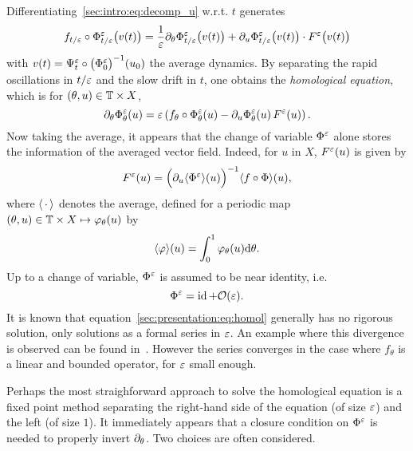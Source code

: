 Differentiating~\eqref{sec:intro:eq:decomp_u} w.r.t. \( t \) generates
\begin{equation*}
  f_{t/\varepsilon} \circ \Phi^\varepsilon_{t/\varepsilon} \big( v(t) \big) 
  = \frac{1}{\varepsilon} \partial_\theta \Phi^\varepsilon_{t/\varepsilon} \big( v(t) \big)
  + \partial_u \Phi^\varepsilon_{t/\varepsilon}\big( v(t) \big) \cdot F^\varepsilon \big( v(t) \big)
\end{equation*}
with \( v(t) = \Psi^\varepsilon_t \circ \big( \Phi^\varepsilon_0 \big)^{-1} (u_0) \)
the average dynamics. By separating the rapid oscillations in $t/\varepsilon$
and the slow drift in $t$, one obtains the \textit{homological
equation}, which is for $(\theta, u) \in \mathbb{T} \times X$, 
\begin{equation} \label{sec:presentation:eq:homol}
  \partial_\theta \Phi^\varepsilon_{\theta} (u)
  = \varepsilon \left( f_{\theta} \circ \Phi^\varepsilon_{\theta} (u) 
    - \partial_u \Phi^\varepsilon_{\theta} (u) \, F^\varepsilon (u) \right) .
\end{equation}
Now taking the average, it appears that the change of variable $\Phi^\varepsilon$
alone stores the information of the averaged vector field. Indeed, for $u$
in $X$, $F^\varepsilon(u)$ is given by
\begin{equation}
  F^\varepsilon (u) = \Big( \partial_u \langle \Phi^\varepsilon \rangle (u) \Big)^{-1} 
        \langle f \circ \Phi \rangle (u) ,
\end{equation}
where $\langle \,\cdot\, \rangle$ denotes the average, defined for a periodic map
$ (\theta, u) \in \mathbb{T} \times X \mapsto \varphi_\theta(u)$ by
\begin{equation}
  \langle \varphi \rangle (u) = \int_0^1 \varphi_\theta (u) \mathrm{d} \theta .
\end{equation}
Up to a change of variable, $\Phi^\varepsilon$ is assumed to be near identity,
i.e. 
\begin{equation}
  \Phi^\varepsilon = \operatorname{id} + \mathcal{O}(\varepsilon) .
\end{equation}
It is known that equation~\eqref{sec:presentation:eq:homol} generally has no
rigorous solution, only solutions as a formal series in $\varepsilon$. An example
where this divergence is observed can be found
in~\cite{chartier.2010.higher}. However the series converges in the
case where $f_\theta$ is a linear and bounded operator, for $\varepsilon$ small
enough. 

Perhaps the most straighforward approach to solve the homological equation
is a fixed point method separating the right-hand side of the equation (of
size $\varepsilon$) and the left (of size $1$). It immediately appears that a
closure condition on $\Phi^\varepsilon$ is needed to properly invert
$\partial_\theta$. Two choices are often considered.

